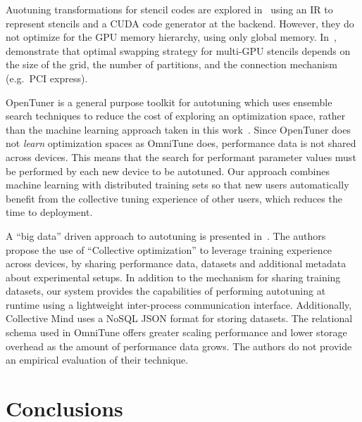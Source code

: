\documentclass[nonatbib,preprint,nocopyrightspace,9pt]{sigplanconf}
\begin{document}
Auotuning transformations for stencil codes are explored
in~\cite{Kamil2010} using an IR to represent stencils and a CUDA code
generator at the backend. However, they do not optimize for the GPU
memory hierarchy, using only global memory. In~\cite{Lutz2013},
\citeauthor{Lutz2013} demonstrate that optimal swapping strategy for
multi-GPU stencils depends on the size of the grid, the number of
partitions, and the connection mechanism (e.g.\ PCI express).

OpenTuner is a general purpose toolkit for autotuning which uses
ensemble search techniques to reduce the cost of exploring an
optimization space, rather than the machine learning approach taken in
this work~\cite{Ansel2013}. Since OpenTuner does not \emph{learn}
optimization spaces as OmniTune does, performance data is not shared
across devices. This means that the search for performant parameter
values must be performed by each new device to be autotuned. Our
approach combines machine learning with distributed training sets so
that new users automatically benefit from the collective tuning
experience of other users, which reduces the time to deployment.

A ``big data'' driven approach to autotuning is presented
in~\cite{Fursin2014}. The authors propose the use of ``Collective
optimization'' to leverage training experience across devices, by
sharing performance data, datasets and additional metadata about
experimental setups. In addition to the mechanism for sharing training
datasets, our system provides the capabilities of performing
autotuning at runtime using a lightweight inter-process communication
interface. Additionally, Collective Mind uses a NoSQL JSON format for
storing datasets. The relational schema used in OmniTune offers
greater scaling performance and lower storage overhead as the amount
of performance data grows. The authors do not provide an empirical
evaluation of their technique.


\section{Conclusions}\label{sec:conclusions}
\end{document}
